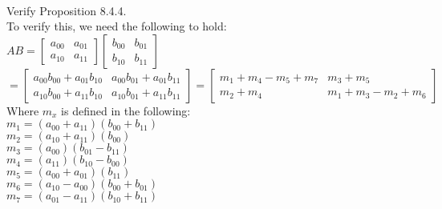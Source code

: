 \documentclass[letterpaper,10pt]{article}
\begin{document}
\begin{flushleft}
~\\
\newpage
  Verify Proposition 8.4.4.
~\\
To verify this, we need the following to hold:\\
$AB=
\left[ 
	\begin{array}{cc}
		a_{00} & a_{01}\\
		a_{10} & a_{11} 
	\end{array} 
\right]
\left[ 
	\begin{array}{cc}
		b_{00} & b_{01}\\
		b_{10} & b_{11}
	\end{array} 
\right]$\\
$=
\left[ 
	\begin{array}{cc}
		a_{00}b_{00}+a_{01}b_{10} & a_{00}b_{01}+a_{01}b_{11}\\
		a_{10}b_{00}+a_{11}b_{10} & a_{10}b_{01}+a_{11}b_{11} 
	\end{array} 
\right]
=
\left[ 
	\begin{array}{cc}
		m_1+m_4-m_5+m_7 & m_3+m_5\\
		m_2+m_4 & m_1+m_3-m_2+m_6 
	\end{array} 
\right]$\\


Where $m_x$ is defined in the following:\\
$m_1=(a_{00}+a_{11})(b_{00}+b_{11})$\\
$m_2=(a_{10}+a_{11})(b_{00})$\\
$m_3=(a_{00})(b_{01}-b_{11})$\\
$m_4=(a_{11})(b_{10}-b_{00})$\\
$m_5=(a_{00}+a_{01})(b_{11})$\\
$m_6=(a_{10}-a_{00})(b_{00}+b_{01})$\\
$m_7=(a_{01}-a_{11})(b_{10}+b_{11})$\\


\end{flushleft}
\end{document}

